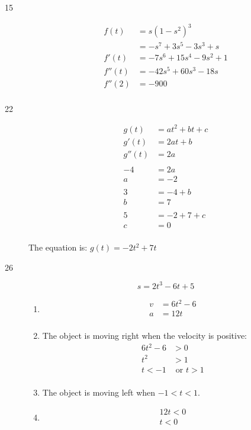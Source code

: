 \documentclass{exam}
\begin{document}
\begin{description}
\item[15]
\begin{align*}
  f(t)   &= s(1-s^2)^3 \\
         &= -s^7 + 3s^5 - 3s^3 + s \\
  f'(t)  &= -7s^6 + 15s^4 - 9s^2 + 1 \\
  f''(t) &= -42s^5 + 60s^3 - 18s \\
  f''(2) &= -900 \\ 
\end{align*}

\item[22]
\begin{align*}
  g(t)   &= at^2 + bt + c \\
  g'(t)  &= 2at + b \\
  g''(t) &= 2a \\
  \\ 
  -4 &= 2a \\
  a  &= -2 \\
  \\
  3 &= -4 + b \\
  b &= 7 \\
  \\
  5 &= -2 + 7 + c\\
  c &= 0 \\
\end{align*}

The equation is: $g(t) = -2t^2 + 7t$

\item[26]
\[
  s = 2t^3 - 6t + 5
\]

\begin{enumerate}[a]
\item
\begin{align*}
  v &= 6t^2 - 6 \\
  a &= 12 t \\
\end{align*}

\item
The object is moving right when the velocity is positive:
\begin{align*}
  6t^2 - 6 &> 0 \\
  t^2 &> 1 \\
  t < -1 & \text{ or } t > 1 \\
\end{align*}

\item
The object is moving left when $-1 < t < 1$.

\item
\begin{align*}
  12t < 0 \\
  t < 0 \\
\end{align*}


\end{enumerate}
\end{description}
\end{document}
